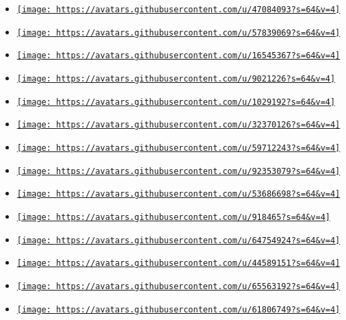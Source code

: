 \begin{itemize}
\item
  \href{https://github.com/LaurenzV}{\texttt{[image: https://avatars.githubusercontent.com/u/47084093?s=64\&v=4]}}
\item
  \href{https://github.com/MDLC01}{\texttt{[image: https://avatars.githubusercontent.com/u/57839069?s=64\&v=4]}}
\item
  \href{https://github.com/NeillJohnston}{\texttt{[image: https://avatars.githubusercontent.com/u/16545367?s=64\&v=4]}}
\item
  \href{https://github.com/PgBiel}{\texttt{[image: https://avatars.githubusercontent.com/u/9021226?s=64\&v=4]}}
\item
  \href{https://github.com/SillyFreak}{\texttt{[image: https://avatars.githubusercontent.com/u/1029192?s=64\&v=4]}}
\item
  \href{https://github.com/abramchikd}{\texttt{[image: https://avatars.githubusercontent.com/u/32370126?s=64\&v=4]}}
\item
  \href{https://github.com/antonWetzel}{\texttt{[image: https://avatars.githubusercontent.com/u/59712243?s=64\&v=4]}}
\item
  \href{https://github.com/arj0019}{\texttt{[image: https://avatars.githubusercontent.com/u/92353079?s=64\&v=4]}}
\item
  \href{https://github.com/astrale-sharp}{\texttt{[image: https://avatars.githubusercontent.com/u/53686698?s=64\&v=4]}}
\item
  \href{https://github.com/damaxwell}{\texttt{[image: https://avatars.githubusercontent.com/u/918465?s=64\&v=4]}}
\item
  \href{https://github.com/dikkadev}{\texttt{[image: https://avatars.githubusercontent.com/u/64754924?s=64\&v=4]}}
\item
  \href{https://github.com/frozolotl}{\texttt{[image: https://avatars.githubusercontent.com/u/44589151?s=64\&v=4]}}
\item
  \href{https://github.com/kiviktnm}{\texttt{[image: https://avatars.githubusercontent.com/u/65563192?s=64\&v=4]}}
\item
  \href{https://github.com/klMse}{\texttt{[image: https://avatars.githubusercontent.com/u/61806749?s=64\&v=4]}}

\end{itemize}

